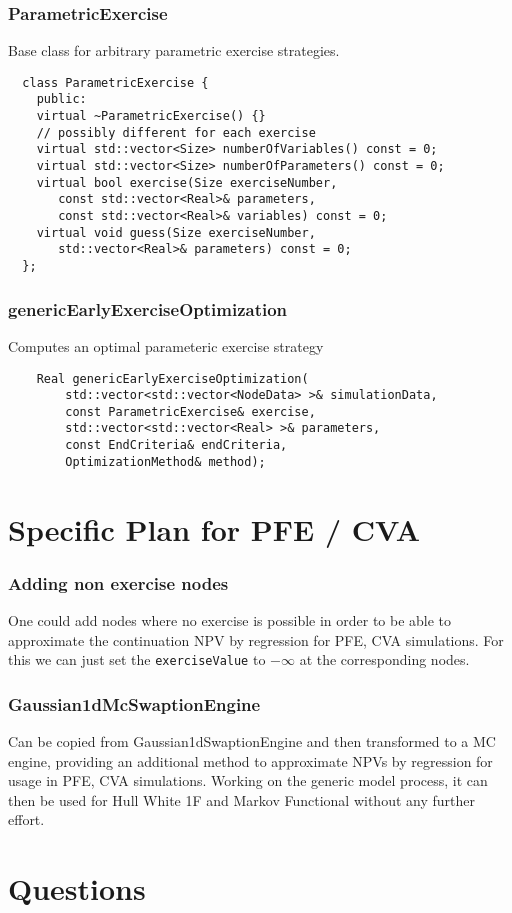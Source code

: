 \documentclass{beamer}
\begin{document}
\begin{frame}[fragile]
\frametitle{ParametricExercise}
Base class for arbitrary parametric exercise strategies.
\begin{verbatim}
  class ParametricExercise {
    public:
    virtual ~ParametricExercise() {}
    // possibly different for each exercise
    virtual std::vector<Size> numberOfVariables() const = 0;
    virtual std::vector<Size> numberOfParameters() const = 0;
    virtual bool exercise(Size exerciseNumber,
       const std::vector<Real>& parameters,
       const std::vector<Real>& variables) const = 0;
    virtual void guess(Size exerciseNumber,
       std::vector<Real>& parameters) const = 0;
  };
\end{verbatim}
\end{frame}

\begin{frame}[fragile]
\frametitle{genericEarlyExerciseOptimization}
Computes an optimal parameteric exercise strategy
\begin{verbatim}
    Real genericEarlyExerciseOptimization(
        std::vector<std::vector<NodeData> >& simulationData,
        const ParametricExercise& exercise,
        std::vector<std::vector<Real> >& parameters,
        const EndCriteria& endCriteria,
        OptimizationMethod& method);
\end{verbatim}
\end{frame}

\section{Specific Plan for PFE / CVA}

\begin{frame}[fragile]
\frametitle{Adding non exercise nodes}
One could add nodes where no exercise is possible in order to be able to approximate
the continuation NPV by regression for PFE, CVA simulations. For this we can just
set the \verb+exerciseValue+ to $-\infty$ at the corresponding nodes.
\end{frame}

\begin{frame}
\frametitle{Gaussian1dMcSwaptionEngine}
Can be copied from Gaussian1dSwaptionEngine and then transformed to a MC engine,
providing an additional method to approximate NPVs by regression for usage in PFE,
CVA simulations.
Working on the generic model process, it can then be used for Hull White 1F and
Markov Functional without any further effort.
\end{frame}

\section{Questions}

\end{document}
